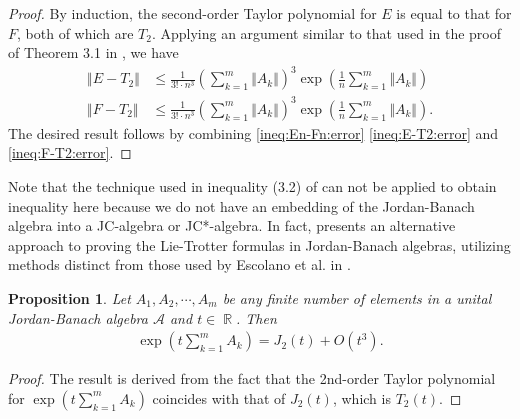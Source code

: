 \documentclass{article}
\theoremstyle{plain} %
\newtheorem{prop}[thm]{Proposition}
\numberwithin{equation}{section}
\DeclareMathOperator{\Rdb}{{\mathbb R}}
\newcommand{\norm}[1]{\left\Vert#1\right\Vert}
\begin{document}
\begin{proof}
By induction, the second-order Taylor polynomial for $E$ is equal to that for $F$, both of which are $T_2$. Applying an argument similar to that used in the proof of Theorem 3.1 in \cite{chehade:wang:wang:2024:suzuki}, we have
\begin{align}
   \norm{E-T_2}&\leq \frac{1}{3!\cdot n^3}\left(\sum_{k=1}^m \Vert A_k\Vert \right)^3\exp \left(\frac{1}{n}\sum_{k=1}^m \Vert A_k\Vert \right) \label{ineq:E-T2:error}  \\
   \norm{F-T_2}&\leq \frac{1}{3!\cdot n^3}\left(\sum_{k=1}^m \Vert A_k\Vert \right)^3\exp \left(\frac{1}{n}\sum_{k=1}^m \Vert A_k\Vert \right). \label{ineq:F-T2:error}
\end{align}
The desired result follows by combining \cref{ineq:En-Fn:error} \cref{ineq:E-T2:error} and \cref{ineq:F-T2:error}. 
\end{proof}

Note that the technique used in inequality (3.2) of \cite{chehade:wang:wang:2024:suzuki} can not be applied to obtain inequality  here because we do not have an embedding of the Jordan-Banach algebra into a JC-algebra or JC*-algebra. 
In fact,  presents an alternative approach to proving the Lie-Trotter formulas in Jordan-Banach algebras, utilizing methods distinct from those used by Escolano et al. in \cite{escolano:peralta:villena:2024:lie}.

\begin{prop}\label{prop:Trotter:first:JordanBanach}
Let $A_1, A_2,\cdots, A_m$ be any finite number of elements in a unital Jordan-Banach algebra $\mathcal{A}$ and $t\in \Rdb$. Then
\begin{align*}
 \exp\left(t\sum_{k=1}^m A_k\right)=J_2(t)+O(t^3).   
\end{align*}
\end{prop}
\begin{proof}
The result is derived from the fact that the 2nd-order Taylor polynomial for $\displaystyle \exp\left(t\sum_{k=1}^m A_k\right)$ coincides with that of $J_2(t)$, which is $T_2(t)$.
\end{proof}
\end{document}
